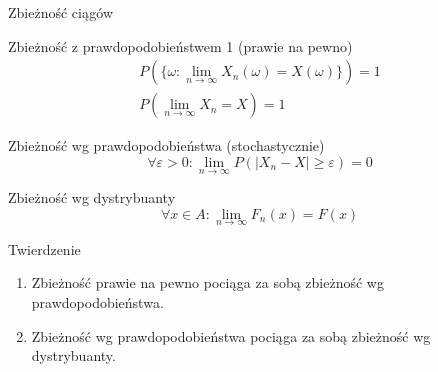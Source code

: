 \documentclass{mp}
\subtitle{Ciągi zmiennych losowych}
\begin{document}
\frame{\titlepage}
\begin{frame}{Zbieżność ciągów}
\only<+>
{
\begin{block}{Zbieżność z prawdopodobieństwem 1 (prawie na pewno)}
\begin{gather*}
P(\{\omega\colon \lim_{n\to\infty}X_n(\omega)=X(\omega)\})=1 \\
P(\lim_{n\to\infty} X_n=X)=1
\end{gather*}
\end{block}
}
\only<+>
{
\begin{block}{Zbieżność wg prawdopodobieństwa (stochastycznie)}
\[\forall\varepsilon>0\colon \lim_{n\to\infty}P(\left|X_n-X\right|\geq\varepsilon)=0\]
\end{block}
}
\only<+>
{
\begin{block}{Zbieżność wg dystrybuanty}
\[\forall x\in A\colon \lim_{n\to\infty} F_n(x) =F(x) \]
\end{block}
}
\only<+>
{
	\begin{block}{Twierdzenie}
	\begin{enumerate}
	\item Zbieżność prawie na pewno pociąga za sobą zbieżność wg prawdopodobieństwa.
	\item Zbieżność wg prawdopodobieństwa pociąga za sobą zbieżność wg dystrybuanty.
	\end{enumerate}
	\end{block}
}
\end{frame}
\end{document}

